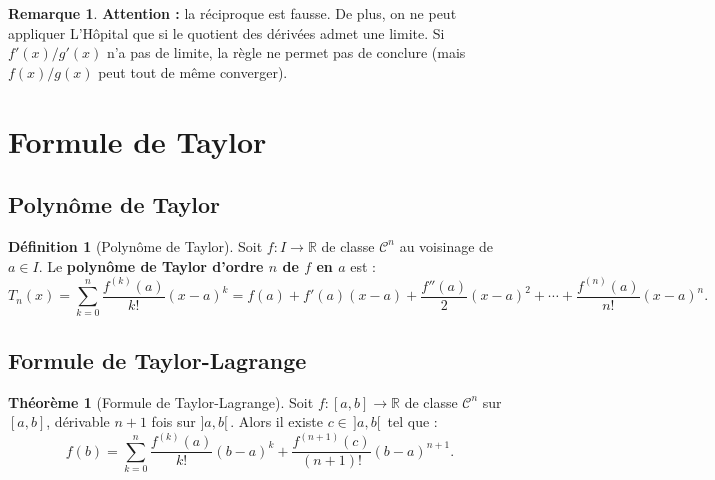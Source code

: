 \documentclass[12pt,a4paper,openany]{book}
\theoremstyle{definition}
\newtheorem{definition}{Définition}[chapter]
\newtheorem{theoreme}{Théorème}[chapter]
\newtheorem{remarque}{Remarque}[chapter]
\newcommand{\R}{\mathbb{R}}
\begin{document}
\begin{remarque}\label{rem:hopital-attention}
\textbf{Attention :} la réciproque est fausse. De plus, on ne peut appliquer L'Hôpital que si le quotient des dérivées admet une limite. Si $f'(x)/g'(x)$ n'a pas de limite, la règle ne permet pas de conclure (mais $f(x)/g(x)$ peut tout de même converger).
\end{remarque}

\section{Formule de Taylor}\label{sec:taylor}

\subsection{Polynôme de Taylor}

\begin{definition}[Polynôme de Taylor]\label{def:polynome-taylor}
Soit $f \colon I \to \R$ de classe $\mathcal{C}^n$ au voisinage de $a \in I$. Le \textbf{polynôme de Taylor d'ordre $n$ de $f$ en $a$} est :
\[
  T_n(x) = \sum_{k=0}^{n} \frac{f^{(k)}(a)}{k!}(x - a)^k
  = f(a) + f'(a)(x-a) + \frac{f''(a)}{2}(x-a)^2 + \cdots + \frac{f^{(n)}(a)}{n!}(x-a)^n.
\]
\end{definition}

\subsection{Formule de Taylor-Lagrange}

\begin{theoreme}[Formule de Taylor-Lagrange]\label{thm:taylor-lagrange}
Soit $f \colon [a, b] \to \R$ de classe $\mathcal{C}^n$ sur $[a, b]$, dérivable $n+1$ fois sur $]a, b[\,$. Alors il existe $c \in \,]a, b[\,$ tel que :
\[
  f(b) = \sum_{k=0}^{n} \frac{f^{(k)}(a)}{k!}(b - a)^k + \frac{f^{(n+1)}(c)}{(n+1)!}(b - a)^{n+1}.
\]
\end{theoreme}
\end{document}
